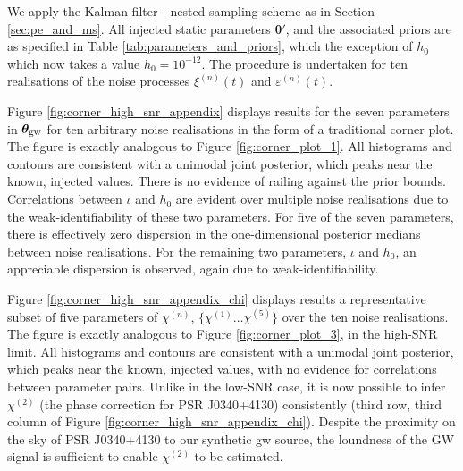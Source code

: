 \documentclass[fleqn,usenatbib,useAMS]{mnras}
\begin{document}
We apply the Kalman filter - nested sampling scheme as in Section \ref{sec:pe_and_ms}. All injected static parameters $\boldsymbol{\theta}'$, and the associated priors are as specified in Table \ref{tab:parameters_and_priors}, which the exception of $h_0$ which now takes a value $h_0 = 10^{-12}$. The procedure is undertaken for ten realisations of the noise processes $\xi^{(n)}(t)$ and $\varepsilon^{(n)}(t)$. \newline 


Figure \ref{fig:corner_high_snr_appendix} displays results for the seven parameters in $\boldsymbol{\theta}_{\rm gw}$ for ten arbitrary noise realisations in the form of a traditional corner plot. The figure is exactly analogous to Figure \ref{fig:corner_plot_1}. All histograms and contours are consistent with a unimodal joint posterior, which peaks near the known, injected values. There is no evidence of railing against the prior bounds. Correlations between $\iota$ and $h_0$ are evident over multiple noise realisations due to the weak-identifiability of these two parameters. For five of the seven parameters, there is effectively zero dispersion in the one-dimensional posterior medians between noise realisations. For the remaining two parameters, $\iota$ and $h_0$, an appreciable dispersion is observed, again due to weak-identifiability. \newline 


Figure \ref{fig:corner_high_snr_appendix_chi} displays results a representative subset of five parameters of $\chi^{(n)}$, $ \{\chi^{(1)} \dots \chi^{(5)} \}$ over the ten noise realisations. The figure is exactly analogous to Figure \ref{fig:corner_plot_3}, in the high-SNR limit. All histograms and contours are consistent with a unimodal joint posterior, which peaks near the known, injected values, with no evidence for correlations between parameter pairs. Unlike in the low-SNR case, it is now possible to infer $\chi^{(2)}$ (the phase correction for PSR J0340+4130) consistently (third row, third column of Figure \ref{fig:corner_high_snr_appendix_chi}). Despite the proximity on the sky of PSR J0340+4130 to our synthetic gw source, the loundness of the GW signal is sufficient to enable $\chi^{(2)}$ to be estimated.
\end{document}
